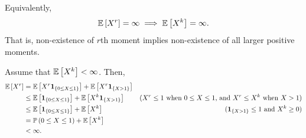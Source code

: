 \begin{enumerate}
\begin{proposition}
\begin{note}
Equivalently,
\[
\mathbb{E}\left[X^r\right]=\infty\implies \mathbb{E}\left[X^k\right]=\infty.
\]
That is, non-existence of \(r\)th moment implies non-existence of
all larger positive moments.
\end{note}
\end{proposition}
\begin{pf}
Assume that \(\mathbb{E}\left[X^k\right]<\infty\). Then,
\begin{align*}
\mathbb{E}\left[X^r\right]&=\mathbb{E}\left[X^r\mathbf{1}_{\left\{0\le X\le 1\right\}}\right]+\mathbb{E}\left[X^r\mathbf{1}_{\left\{X>1\right\}}\right]\\
&\le \mathbb{E}\left[\mathbf{1}_{\left\{0\le X\le 1\right\}}\right]+\mathbb{E}\left[X^k\mathbf{1}_{\left\{X>1\right\}}\right] &\text{(\(X^r \le 1\) when \(0\le X\le 1\), and \(X^r\le X^k\) when \(X>1\))}\\
&\le \mathbb{E}\left[\mathbf{1}_{\left\{0\le X\le 1\right\}}\right]+\mathbb{E}\left[X^k\right]&\text{(\(\mathbf{1}_{\left\{X>1\right\}}\le 1\) and \(X^k\ge 0\))}\\
&=\mathbb{P}\left(0\le X\le 1\right)+\mathbb{E}\left[X^k\right]\\
&<\infty.
\end{align*}
\end{pf}


\end{enumerate}
